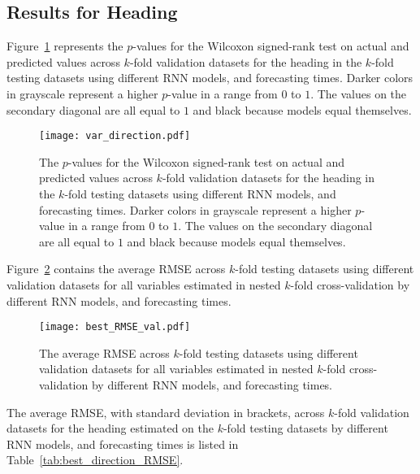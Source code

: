 \subsection{Results for Heading}

Figure~\ref{fig:var_direction} represents the $p$-values for the Wilcoxon signed-rank test on actual and predicted values across $k$-fold validation datasets for the heading in the $k$-fold testing datasets using different RNN models, and forecasting times. Darker colors in grayscale represent a higher $p$-value in a range from $0$ to $1$. The values on the secondary diagonal are all equal to $1$ and black because models equal themselves.

\begin{figure}[!ht]
	\centering
	\texttt{[image: var\_direction.pdf]}
	\caption{The $p$-values for the Wilcoxon signed-rank test on actual and predicted values across $k$-fold validation datasets for the heading in the $k$-fold testing datasets using different RNN models, and forecasting times. Darker colors in grayscale represent a higher $p$-value in a range from $0$ to $1$. The values on the secondary diagonal are all equal to $1$ and black because models equal themselves.}
	\label{fig:var_direction}
\end{figure}

Figure~\ref{fig:best_RMSE_val} contains the average RMSE across $k$-fold testing datasets using different validation datasets for all variables estimated in nested $k$-fold cross-validation by different RNN models, and forecasting times.

\begin{figure}[!ht]
	\centering
	\texttt{[image: best\_RMSE\_val.pdf]}
	\caption{The average RMSE across $k$-fold testing datasets using different validation datasets for all variables estimated in nested $k$-fold cross-validation by different RNN models, and forecasting times.}
	\label{fig:best_RMSE_val}
\end{figure}

The average RMSE, with standard deviation in brackets, across $k$-fold validation datasets for the heading estimated on the $k$-fold testing datasets by different RNN models, and forecasting times is listed in Table~\ref{tab:best_direction_RMSE}.

